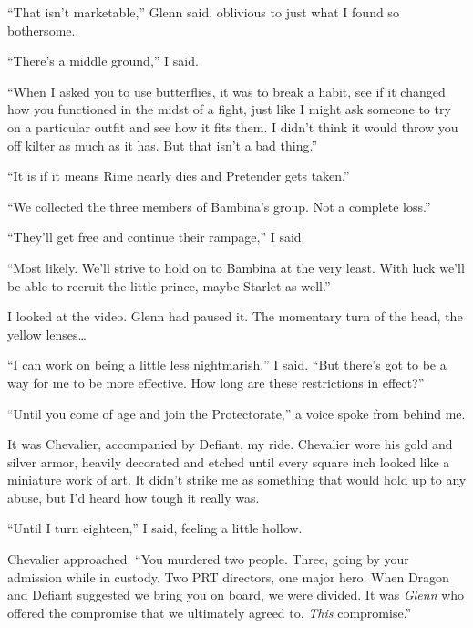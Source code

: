 ``That isn't marketable,'' Glenn said, oblivious to just what I found so bothersome.



``There's a middle ground,'' I said.



``When I asked you to use butterflies, it was to break a habit, see if it changed how you functioned in the midst of a fight, just like I might ask someone to try on a particular outfit and see how it fits them.  I didn't think it would throw you off kilter as much as it has.  But that isn't a bad thing.''



``It is if it means Rime nearly dies and Pretender gets taken.''



``We collected the three members of Bambina's group.  Not a complete loss.''



``They'll get free and continue their rampage,'' I said.



``Most likely.  We'll strive to hold on to Bambina at the very least.  With luck we'll be able to recruit the little prince, maybe Starlet as well.''



I looked at the video.  Glenn had paused it.  The momentary turn of the head, the yellow lenses\ldots



``I can work on being a little less nightmarish,'' I said.  ``But there's got to be a way for me to be more effective.  How long are these restrictions in effect?''



``Until you come of age and join the Protectorate,'' a voice spoke from behind me.



It was Chevalier, accompanied by Defiant, my ride.  Chevalier wore his gold and silver armor, heavily decorated and etched until every square inch looked like a miniature work of art.  It didn't strike me as something that would hold up to any abuse, but I'd heard how tough it really was.



``Until I turn eighteen,'' I said, feeling a little hollow.



Chevalier approached.  ``You murdered two people.  Three, going by your admission while in custody.  Two PRT directors, one major hero.  When Dragon and Defiant suggested we bring you on board, we were divided.  It was \emph{Glenn} who offered the compromise that we ultimately agreed to.  \emph{This} compromise.''



